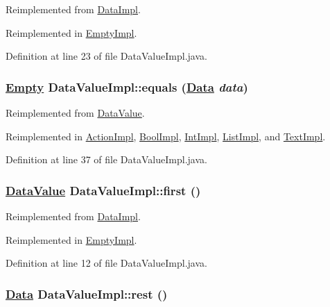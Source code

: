 Reimplemented from \hyperlink{classDataImpl_a0}{Data\-Impl}.

Reimplemented in \hyperlink{classEmptyImpl_a2}{Empty\-Impl}.

Definition at line 23 of file Data\-Value\-Impl.java.\hypertarget{classDataValueImpl_a5}{
\subsubsection[equals]{\setlength{\rightskip}{0pt plus 5cm}\hyperlink{interfaceEmpty}{Empty} Data\-Value\-Impl::equals (\hyperlink{interfaceData}{Data} {\em data})}}
\label{classDataValueImpl_a5}




Reimplemented from \hyperlink{interfaceDataValue_a0}{Data\-Value}.

Reimplemented in \hyperlink{classActionImpl_a21}{Action\-Impl}, \hyperlink{classBoolImpl_a2}{Bool\-Impl}, \hyperlink{classIntImpl_a9}{Int\-Impl}, \hyperlink{classListImpl_a5}{List\-Impl}, and \hyperlink{classTextImpl_a1}{Text\-Impl}.

Definition at line 37 of file Data\-Value\-Impl.java.\hypertarget{classDataValueImpl_a0}{
\subsubsection[first]{\setlength{\rightskip}{0pt plus 5cm}\hyperlink{interfaceDataValue}{Data\-Value} Data\-Value\-Impl::first ()}}
\label{classDataValueImpl_a0}




Reimplemented from \hyperlink{classDataImpl_a2}{Data\-Impl}.

Reimplemented in \hyperlink{classEmptyImpl_a1}{Empty\-Impl}.

Definition at line 12 of file Data\-Value\-Impl.java.\hypertarget{classDataValueImpl_a1}{
\subsubsection[rest]{\setlength{\rightskip}{0pt plus 5cm}\hyperlink{interfaceData}{Data} Data\-Value\-Impl::rest ()}}
\label{classDataValueImpl_a1}




